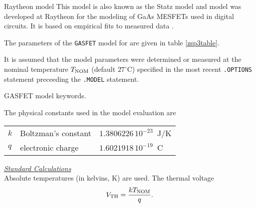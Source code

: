 
Raytheon model\newline
This model is also known as the Statz model and
model was developed at Raytheon for the modeling of GaAs
MESFETs used in digital circuits.  It is based on empirical
fits to measured data \cite{statz:87}.

The parameters of the {\tt GASFET} model for \pspice are given in table
\ref{zsp3table}.

It is assumed that the model parameters were determined or
measured at the nominal temperature $T_{\mbox{\scriptsize NOM}}$ (default
$27^{\circ}$C) specified in the most recent {\tt .OPTIONS} statement
preceeding the {\tt .MODEL} statement.
\begin{table}[h]
\caption{\spicethree GASFET model keywords. \label{zsp3table}}
\end{table}
The physical constants used in the model evaluation are
\begin{center}
\begin{tabular}{|l|l|l|}
\hline
$k$ & Boltzman's constant           &  $1.3806226\,10^{-23}$~J/K\\
$q$ & electronic charge             & $1.6021918\,10^{-19}$~C\\
\hline
\end{tabular}
\end{center}
\noindent\underline{\sl \large Standard Calculations}\\[0.1in]
Absolute temperatures (in kelvins, K) are used.
The thermal voltage
\begin{equation}
V_{\mbox{\scriptsize TH}} = {{kT_{\mbox{\scriptsize NOM}}} \over q} .
\end{equation}

